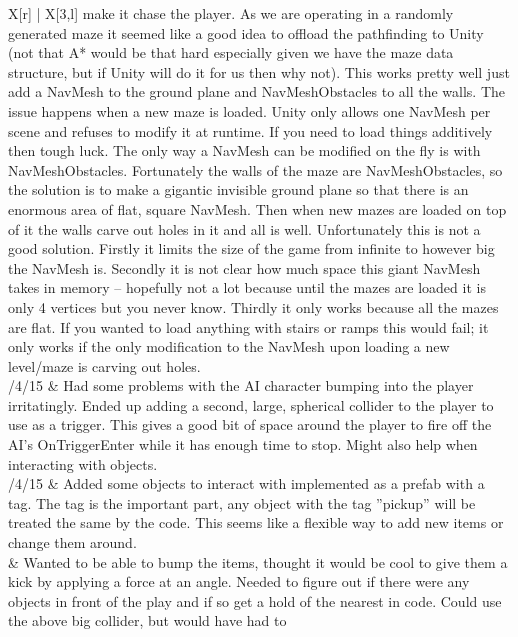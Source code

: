 \documentclass[11pt]{article}
\begin{document}
\begin{longtabu}{X[r] | X[3,l]}
						make it chase the player. As we are operating in a randomly generated maze it seemed
						like a good idea to offload the pathfinding to Unity (not that A* would be that hard
						especially given we have the maze data structure, but if Unity will do it for us
						then why not). This works pretty well just add a NavMesh to the ground plane and 
						NavMeshObstacles to all the walls. The issue happens when a new maze is loaded. 
						Unity only allows one NavMesh per scene and refuses to modify it at runtime. If 
						you need to load things additively then tough luck. The only way a NavMesh can be 
						modified on the fly is with NavMeshObstacles. Fortunately the walls of the maze are 
						NavMeshObstacles, so the solution is to make a gigantic invisible ground plane so 
						that there is an enormous area of flat, square NavMesh. Then when new mazes are 
						loaded on top of it the walls carve out holes in it and all is well. Unfortunately 
						this is not a good solution. Firstly it limits the size of the game from infinite
						to however big the NavMesh is. Secondly it is not clear how much space this giant
						NavMesh takes in memory -- hopefully not a lot because until the mazes are loaded it
						is only 4 vertices but you never know. Thirdly it only works because all the mazes 
						are flat. If you wanted to load anything with stairs or ramps this would fail; it 
						only works if the only modification to the NavMesh upon loading a new level/maze is
						carving out holes.\\
	/4/15 & Had some problems with the AI character bumping into the player irritatingly. Ended up adding a 
		  second, large, spherical collider to the player to use as a trigger. This gives a good bit of 
		  space around the player to fire off the AI's OnTriggerEnter while it has enough time to stop.
		  Might also help when interacting with objects.\\
	/4/15 & Added some objects to interact with implemented as a prefab with a tag. The tag is the important
		  part, any object with the tag ''pickup'' will be treated the same by the code. This seems like a 
		  flexible way to add new items or change them around. \\
		& Wanted to be able to bump the items, thought it would be cool to give them a kick by applying a
		  force at an angle. Needed to figure out if there were any objects in front of the play and if so 
		  get a hold of the nearest in code. Could use the above big collider, but would have had to 

\end{longtabu}
\end{document}
